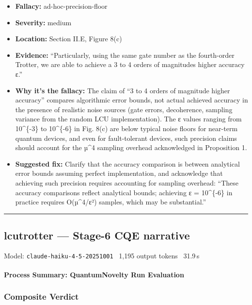 \documentclass[10pt,letterpaper]{article}
\providecommand{\tightlist}{\setlength{\itemsep}{0pt}\setlength{\parskip}{0pt}}
\begin{document}
\begin{itemize}
\tightlist
\item
  \textbf{Fallacy:} ad-hoc-precision-floor
\item
  \textbf{Severity:} medium
\item
  \textbf{Location:} Section II.E, Figure 8(c)
\item
  \textbf{Evidence:} ``Particularly, using the same gate number as the fourth-order Trotter, we are able to achieve a 3 to 4 orders of magnitudes higher accuracy ε.''
\item
  \textbf{Why it's the fallacy:} The claim of ``3 to 4 orders of magnitude higher accuracy'' compares algorithmic error bounds, not actual achieved accuracy in the presence of realistic noise sources (gate errors, decoherence, sampling variance from the random LCU implementation). The ε values ranging from 10\^{}\{-3\} to 10\^{}\{-6\} in Fig. 8(c) are below typical noise floors for near-term quantum devices, and even for fault-tolerant devices, such precision claims should account for the µ\^{}4 sampling overhead acknowledged in Proposition 1.
\item
  \textbf{Suggested fix:} Clarify that the accuracy comparison is between analytical error bounds assuming perfect implementation, and acknowledge that achieving such precision requires accounting for sampling overhead: ``These accuracy comparisons reflect analytical bounds; achieving ε = 10\^{}\{-6\} in practice requires O(µ\^{}4/ε²) samples, which may be substantial.''
\end{itemize}

\begin{center}\rule{0.5\linewidth}{0.5pt}\end{center}


\subsection{lcutrotter --- Stage-6 CQE narrative}
\noindent\textcolor{muted}{\small Model: \texttt{claude-haiku-4-5-20251001} \textperiodcentered\ 1,195 output tokens \textperiodcentered\ 31.9\,s}

\hypertarget{process-summary-quantumnovelty-run-evaluation}{%
\paragraph{Process Summary: QuantumNovelty Run Evaluation}\label{process-summary-quantumnovelty-run-evaluation}}

\hypertarget{composite-verdict}{%
\subsubsection{Composite Verdict}\label{composite-verdict}}
\end{document}
